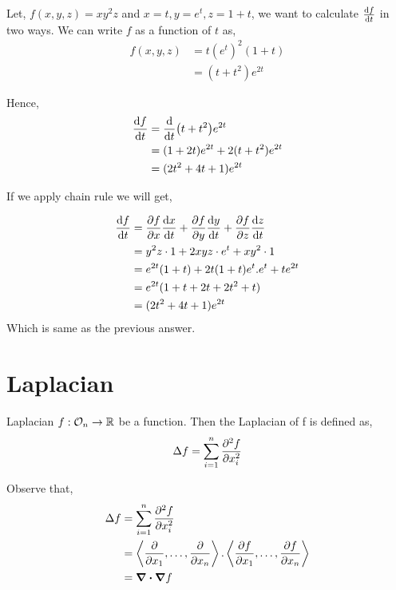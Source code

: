 \documentclass[../Analysis-3.tex]{subfiles}
\begin{document}
\begin{Eg}{}{}
    Let, $f(x,y,z) = xy^{2}z$ and $x=t, y=e^t, z= 1+t$, we want to calculate $\dv{f}{t}$ in two ways. We can write $f$ as a function of $t$ as,
    \begin{align*}
        f(x,y,z) & = t(e^t)^2(1+t) \\
                 & = (t+t^2)e^{2t}
    \end{align*}

    Hence, \begin{align*}
        \dv{f}{t} & = \dv{t}(t+t^2)e^{2t}           \\
                  & = (1+2t)e^{2t} + 2(t+t^2)e^{2t} \\
                  & = (2t^2+4t+1)e^{2t}
    \end{align*}

    If we apply chain rule we will get,

    \begin{align*}
        \dv{f}{t} & = \pdv{f}{x} \dv{x}{t} + \pdv{f}{y} \dv{y}{t} + \pdv{f}{z} \dv{z}{t} \\
                  & = y^2z\cdot 1 + 2xyz\cdot e^t + xy^2\cdot 1                          \\
                  & = e^{2t}(1+t) + 2t(1+t)e^t.e^t + te^{2t}                             \\
                  & = e^{2t}(1+t+2t+2t^2+t)                                              \\
                  & = (2t^2+4t+1)e^{2t}
    \end{align*}
    Which is same as the previous answer.
\end{Eg}


\section{Laplacian}

\begin{Def}{Laplacian}{}
    $f : \mathcal{O}_{n} \to \mathbb{R}$ be a function. Then the Laplacian of f is defined as, \[ \Delta f = \sum_{i = 1}^{n} \pdv[2]{f}{x_i}   \]
\end{Def}

Observe that,  \begin{align*}
    \Delta f & = \sum_{i=1}^{n} \pdv[2]{f}{x_i}                                                                                               \\
             & = \left\langle \pdv{}{x_1}, \ldots, \pdv{}{x_n}  \right\rangle. \left\langle \pdv{f}{x_1}, \ldots, \pdv{f}{x_n}  \right\rangle \\
             & = \div\grad f
\end{align*}
\end{document}
